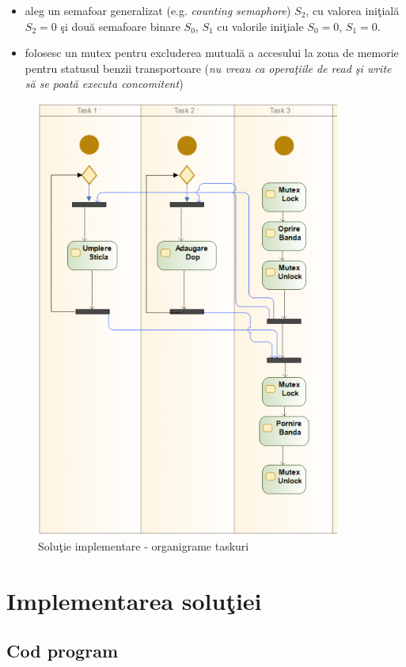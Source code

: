 \documentclass[a4paper, 11pt]{article}
\begin{document}
\begin{itemize}
\item aleg un semafoar generalizat (e.g. \textit{counting semaphore}) $S_2$, cu valorea ini\c{t}ial\u{a}  $S_2 = 0$ \c{s}i dou\u{a} semafoare binare $S_0$, $S_1$ cu valorile ini\c{t}iale $S_0 = 0$, $S_1 = 0$.
\item folosesc un mutex pentru excluderea mutual\u{a} a accesului la zona de memorie pentru statusul benzii transportoare (\textit{nu vreau ca opera\c{t}iile de read \c{s}i write s\u{a} se poat\u{a} executa concomitent})
\end{itemize}


\begin{figure} [!htb]
\centering
\includegraphics[width=10cm]{./images/SolutieImplementare.png}
\caption{\label{fig:taskuri}Solu\c{t}ie implementare - organigrame taskuri}
\end{figure} 

\clearpage
\section{Implementarea solu\c{t}iei}

\subsection{Cod program}
\end{document}
